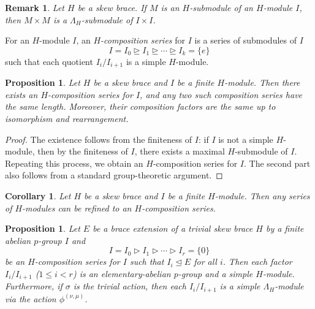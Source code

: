 \documentclass[11pt]{amsart}
\theoremstyle{thrm}
\theoremstyle{plain}
\newtheorem{prop}[thm]{Proposition}
\newtheorem{cor}[thm]{Corollary}
\newtheorem{remark}[thm]{Remark}
\theoremstyle{definition}
\numberwithin{equation}{section}
\begin{document}
\begin{remark}
Let $H$ be a skew brace. If \(M\) is an \(H\)-submodule of an $H$-module  \(I\), then \(M \times M\) is a \(\Lambda_H\)-submodule of \(I \times I\). 
\end{remark}

For an $H$-module $I$,  an  \emph{$H$-composition series} for $I$ is a series of submodules of $I$
	\[
	I = I_0 \trianglerighteq I_1 \trianglerighteq \cdots \trianglerighteq I_k = \{e\}
	\]
	such that each quotient $I_i / I_{i+1}$ is a simple $H$-module.


\begin{prop}
	Let $H$ be a skew brace and   $I$ be a finite  $H$-module.  Then there exists an $H$-composition series for $I$, and any two such composition series have the same length. Moreover, their composition factors are the same up to isomorphism and rearrangement.
\end{prop}

\begin{proof}
The existence follows from the finiteness of $I$: if $I$ is not a simple $H$-module, then by the finiteness of $I$, there exists a maximal $H$-submodule of $I$. Repeating this process, we obtain an $H$-composition series for $I$. The second part also follows from a standard group-theoretic argument.
\end{proof}

\begin{cor}\label{refine}
		Let $H$ be a skew brace and   $I$ be a finite  $H$-module. Then any series of $H$-modules can be  refined to an $H$-composition series.
\end{cor}
	


\begin{prop}
Let $E$ be a brace extension of a trivial skew brace  $H$ by a finite abelian $p$-group $I$ and 
\[
I = I_0 \rhd I_1 \rhd \cdots \rhd I_r = \{0\}
\]
be an $H$-composition series for $I$ such that $I_i \trianglelefteq E$ for all $i$. Then each factor $I_i / I_{i+1}$ ($1 \leq i < r$) is an elementary-abelian $p$-group and a simple $H$-module. Furthermore,  if $\sigma$ is the trivial action,  then each $I_i / I_{i+1}$ is a simple $\Lambda_H$-module via the action $\phi^{(\nu, \mu)}$. 
\end{prop}
\end{document}
